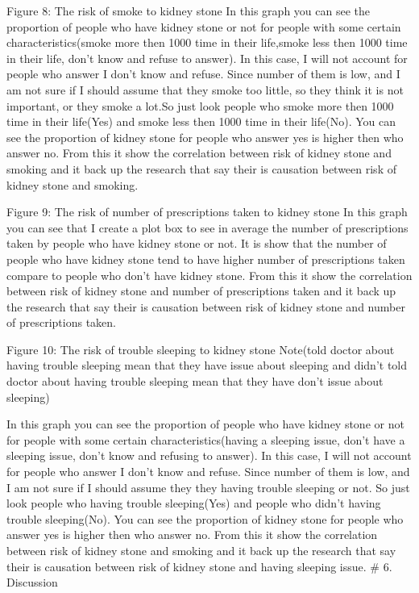 \documentclass[
]{article}
\begin{document}
Figure 8: The risk of smoke to kidney stone In this graph you can see
the proportion of people who have kidney stone or not for people with
some certain characteristics(smoke more then 1000 time in their
life,smoke less then 1000 time in their life, don't know and refuse to
answer). In this case, I will not account for people who answer I don't
know and refuse. Since number of them is low, and I am not sure if I
should assume that they smoke too little, so they think it is not
important, or they smoke a lot.So just look people who smoke more then
1000 time in their life(Yes) and smoke less then 1000 time in their
life(No). You can see the proportion of kidney stone for people who
answer yes is higher then who answer no. From this it show the
correlation between risk of kidney stone and smoking and it back up the
research that say their is causation between risk of kidney stone and
smoking.

Figure 9: The risk of number of prescriptions taken to kidney stone In
this graph you can see that I create a plot box to see in average the
number of prescriptions taken by people who have kidney stone or not. It
is show that the number of people who have kidney stone tend to have
higher number of prescriptions taken compare to people who don't have
kidney stone. From this it show the correlation between risk of kidney
stone and number of prescriptions taken and it back up the research that
say their is causation between risk of kidney stone and number of
prescriptions taken.

Figure 10: The risk of trouble sleeping to kidney stone Note(told doctor
about having trouble sleeping mean that they have issue about sleeping
and didn't told doctor about having trouble sleeping mean that they have
don't issue about sleeping)

In this graph you can see the proportion of people who have kidney stone
or not for people with some certain characteristics(having a sleeping
issue, don't have a sleeping issue, don't know and refusing to answer).
In this case, I will not account for people who answer I don't know and
refuse. Since number of them is low, and I am not sure if I should
assume they they having trouble sleeping or not. So just look people who
having trouble sleeping(Yes) and people who didn't having trouble
sleeping(No). You can see the proportion of kidney stone for people who
answer yes is higher then who answer no. From this it show the
correlation between risk of kidney stone and smoking and it back up the
research that say their is causation between risk of kidney stone and
having sleeping issue. \# 6. Discussion
\end{document}
